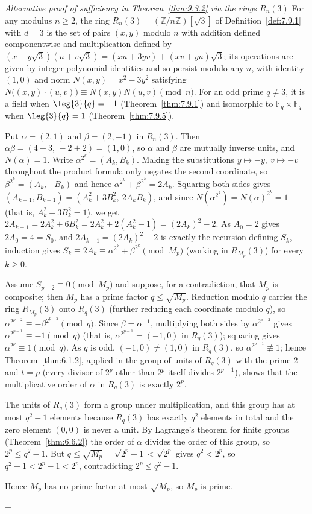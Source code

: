 \documentclass[11pt]{article}
\makeatletter
\theoremstyle{ntstyle}
\let\nt@closedisplay\]
\def\nt@guardedclose{\@ifnextchar\par{\nt@closeafterpar}{\@ifnextchar\end{\postdisplaypenalty\@M\nt@closedisplay}{\nt@closedisplay}}}
\def\nt@closeafterpar\par{\@ifnextchar\par{\nt@closeafterpar}{\@ifnextchar\end{\postdisplaypenalty\@M\nt@closedisplay\par}{\nt@closedisplay\par}}}
\renewenvironment{proof}[1][\proofname]{\par
  \pushQED{\qed}\normalfont\topsep\medskipamount\edef\nt@afterproof{\@endparpenalty=\the\@endparpenalty\relax}\@beginparpenalty\@M\@endparpenalty\@M\let\]\nt@guardedclose\trivlist\item[]\textit{#1\@addpunct{.}} \ignorespaces}{\ifvmode\addpenalty\@M\fi\popQED\nt@afterproof\endtrivlist\@endpefalse}
\newenvironment{altproof}[1][\proofname]{\begin{proof}[#1]\renewcommand{\qedsymbol}{}}{\end{proof}}
\makeatother
\begin{document}
\begin{altproof}[Alternative proof of sufficiency in Theorem~\ref{thm:9.3.2} via the rings $R_n(3)$]
	For any modulus $n\ge2$, the ring
	$R_n(3)=(\mathbb{Z}/n\mathbb{Z})[\sqrt{3}]$ of
	Definition~\ref{def:7.9.1} with $d=3$ is the set of pairs $(x,y)$ modulo
	$n$ with addition defined componentwise and multiplication defined by
	$(x+y\sqrt{3})(u+v\sqrt{3})=(xu+3yv)+(xv+yu)\sqrt{3}$; its operations
	are given by integer polynomial identities and so persist modulo any $n$, with
	identity $(1,0)$ and norm $N(x,y)=x^{2}-3y^{2}$ satisfying
	$N\big((x,y)\cdot(u,v)\big)\equiv N(x,y)N(u,v)\pmod{n}$. For an odd prime
	$q\neq3$, it is a field when $\leg{3}{q}=-1$
	(Theorem~\ref{thm:7.9.1}) and isomorphic to
	$\mathbb{F}_q\times\mathbb{F}_q$ when
	$\leg{3}{q}=1$ (Theorem~\ref{thm:7.9.5}).

	Put $\alpha=(2,1)$ and $\beta=(2,-1)$ in $R_n(3)$. Then
	$\alpha\beta=(4-3,\,-2+2)=(1,0)$, so $\alpha$ and $\beta$ are
	mutually inverse units, and $N(\alpha)=1$. Write
	$\alpha^{2^k}=(A_k,B_k)$. Making the substitutions $y\mapsto-y,\ v\mapsto-v$
	throughout the product formula only negates the second coordinate, so
	$\beta^{2^k}=(A_k,-B_k)$ and hence $\alpha^{2^k}+\beta^{2^k}=2A_k$.
	Squaring both sides gives $(A_{k+1},B_{k+1})=(A_k^2+3B_k^2,\ 2A_kB_k)$, and
	since $N(\alpha^{2^k})=N(\alpha)^{2^k}=1$ (that is, $A_k^2-3B_k^2=1$),
	we get $2A_{k+1}=2A_k^2+6B_k^2=2A_k^2+2(A_k^2-1)=(2A_k)^2-2$. As $A_0=2$
	gives $2A_0=4=S_0$, and $2A_{k+1}=(2A_k)^2-2$ is exactly the
	recursion defining $S_k$, induction gives
	$S_k\equiv2A_k\equiv\alpha^{2^k}+\beta^{2^k}\pmod{M_p}$ (working in
	$R_{M_p}(3)$) for every $k\ge0$.

	Assume $S_{p-2}\equiv0\pmod{M_p}$ and suppose, for a contradiction,
	that $M_p$ is composite; then $M_p$ has a prime factor
	$q\le\sqrt{M_p}$. Reduction modulo $q$ carries the ring $R_{M_p}(3)$ onto
	$R_q(3)$ (further reducing each coordinate modulo $q$), so
	$\alpha^{2^{p-2}}\equiv-\beta^{2^{p-2}}\pmod{q}$. Since
	$\beta=\alpha^{-1}$, multiplying both sides by $\alpha^{2^{p-2}}$
	gives $\alpha^{2^{p-1}}\equiv-1\pmod{q}$ (that is, $\alpha^{2^{p-1}}=(-1,0)$ in $R_q(3)$); squaring gives
	$\alpha^{2^{p}}\equiv1\pmod{q}$. As $q$ is odd, $(-1,0)\neq(1,0)$ in
	$R_q(3)$, so $\alpha^{2^{p-1}}\not\equiv1$; hence Theorem~\ref{thm:6.1.2}, applied in the group
	of units of $R_q(3)$ with the prime $2$ and $t=p$ (every divisor of $2^p$
	other than $2^p$ itself divides $2^{p-1}$), shows that the multiplicative
	order of $\alpha$ in $R_q(3)$ is exactly $2^p$.

	The units of $R_q(3)$ form a group under multiplication, and this group has at most
	$q^2-1$ elements because $R_q(3)$ has exactly $q^2$ elements in total
	and the zero element $(0,0)$ is never a unit. By Lagrange's theorem for finite groups (Theorem~\ref{thm:6.6.2})
	the order of $\alpha$ divides the order of this group, so $2^p\le
		q^2-1$. But $q\le\sqrt{M_p}=\sqrt{2^p-1}<\sqrt{2^p}$ gives $q^2<2^p$,
	so $q^2-1<2^p-1<2^p$, contradicting $2^p\le q^2-1$.

	Hence $M_p$ has no prime factor at most $\sqrt{M_p}$, so $M_p$ is prime.

\end{altproof}
\end{document}
